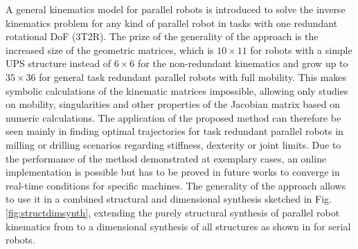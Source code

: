 \documentclass[robotics,article,submit,moreauthors,pdftex]{Definitions/mdpi}
\begin{document}
A general kinematics model for parallel robots is introduced to solve the inverse kinematics problem for any kind of parallel robot in tasks with one redundant rotational DoF (3T2R).
The prize of the generality of the approach is the increased size of the geometric matrices, which is $10 \times 11$ for robots with a simple UPS structure instead of $6\times6$ for the non-redundant kinematics and grow up to $35 \times 36$ for general task redundant parallel robots with full mobility.
This makes symbolic calculations of the kinematic matrices impossible, allowing only studies on mobility, singularities and other properties of the Jacobian matrix based on numeric calculations.
The application of the proposed method can therefore be seen mainly in finding optimal trajectories for task redundant parallel robots in milling or drilling scenarios regarding stiffness, dexterity or joint limits.
%
Due to the performance of the method demonstrated at exemplary cases, an online implementation is possible but has to be proved in future works to converge in real-time conditions for specific machines.
The generality of the approach allows to use it in a combined structural and dimensional synthesis sketched in Fig.\,\ref{fig:structdimsynth}, extending the purely structural synthesis of parallel robot kinematics from \cite{Gogu2008,KongGos2005} to a dimensional synthesis of all structures as shown in \cite{RamirezKotOrt2015} for serial robots.

%
%
%
\end{document}

